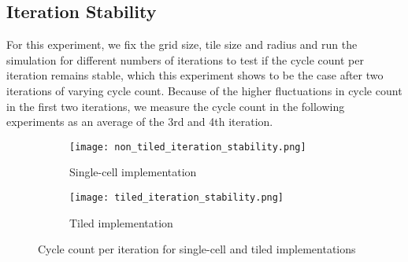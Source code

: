 \subsection{Iteration Stability}
\label{sec:stability_of_cycle_count_per_iteration}
For this experiment, we fix the grid size, tile size and radius and run the simulation for different numbers of iterations to test if the cycle count per iteration remains stable, which this experiment shows to be the case after two iterations of varying cycle count.
Because of the higher fluctuations in cycle count in the first two iterations, we measure the cycle count in the following experiments as an average of the 3rd and 4th iteration.
\begin{figure}[h]
    \centering
    \begin{subfigure}[b]{0.48\textwidth}
        \centering
        \texttt{[image: non\_tiled\_iteration\_stability.png]}
        \caption{Single-cell implementation}
        \label{fig:non_tiled_iteration_stability}
    \end{subfigure}
    \hfill
    \begin{subfigure}[b]{0.48\textwidth}
        \centering
        \texttt{[image: tiled\_iteration\_stability.png]}
        \caption{Tiled implementation}
        \label{fig:tiled_iteration_stability}
    \end{subfigure}
    \caption{Cycle count per iteration for single-cell and tiled implementations}
    \label{fig:iteration_stability}
\end{figure}

